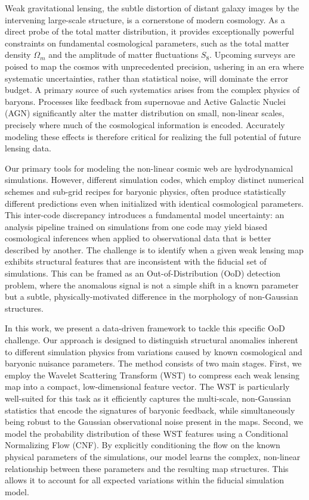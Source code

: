 \documentclass[]{article}
\begin{document}
Weak gravitational lensing, the subtle distortion of distant galaxy images by the intervening large-scale structure, is a cornerstone of modern cosmology. As a direct probe of the total matter distribution, it provides exceptionally powerful constraints on fundamental cosmological parameters, such as the total matter density $\Omega_m$ and the amplitude of matter fluctuations $S_8$. Upcoming surveys are poised to map the cosmos with unprecedented precision, ushering in an era where systematic uncertainties, rather than statistical noise, will dominate the error budget. A primary source of such systematics arises from the complex physics of baryons. Processes like feedback from supernovae and Active Galactic Nuclei (AGN) significantly alter the matter distribution on small, non-linear scales, precisely where much of the cosmological information is encoded. Accurately modeling these effects is therefore critical for realizing the full potential of future lensing data.

Our primary tools for modeling the non-linear cosmic web are hydrodynamical simulations. However, different simulation codes, which employ distinct numerical schemes and sub-grid recipes for baryonic physics, often produce statistically different predictions even when initialized with identical cosmological parameters. This inter-code discrepancy introduces a fundamental model uncertainty: an analysis pipeline trained on simulations from one code may yield biased cosmological inferences when applied to observational data that is better described by another. The challenge is to identify when a given weak lensing map exhibits structural features that are inconsistent with the fiducial set of simulations. This can be framed as an Out-of-Distribution (OoD) detection problem, where the anomalous signal is not a simple shift in a known parameter but a subtle, physically-motivated difference in the morphology of non-Gaussian structures.

In this work, we present a data-driven framework to tackle this specific OoD challenge. Our approach is designed to distinguish structural anomalies inherent to different simulation physics from variations caused by known cosmological and baryonic nuisance parameters. The method consists of two main stages. First, we employ the Wavelet Scattering Transform (WST) to compress each weak lensing map into a compact, low-dimensional feature vector. The WST is particularly well-suited for this task as it efficiently captures the multi-scale, non-Gaussian statistics that encode the signatures of baryonic feedback, while simultaneously being robust to the Gaussian observational noise present in the maps. Second, we model the probability distribution of these WST features using a Conditional Normalizing Flow (CNF). By explicitly conditioning the flow on the known physical parameters of the simulations, our model learns the complex, non-linear relationship between these parameters and the resulting map structures. This allows it to account for all expected variations within the fiducial simulation model.
\end{document}
